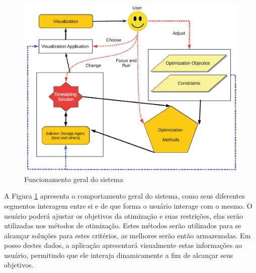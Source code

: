 \begin{figure}[htbp]\centering
    \caption{\label{fig:sistema} Funcionamento geral do sistema}
    \includegraphics[scale=0.6]{files/img/Arquitetura/Arquitetura_bebis_information_2019.png}
\end{figure}

A Figura \ref{fig:sistema} apresenta o comportamento geral do sistema, como seus diferentes segmentos interagem entre si e de que forma o usuário interage com o mesmo. O usuário poderá ajustar os objetivos da otimização e suas restrições, elas serão utilizadas nos métodos de otimização. Estes métodos serão utilizados para se alcançar soluções para estes critérios, as melhores serão então armazenadas. Em posso destes dados, a aplicação apresentará visualmente estas informações ao usuário, permitindo que ele interaja dinamicamente a fim de alcançar seus objetivos.

